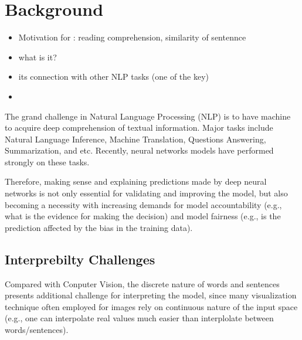 

\section{Background}


\begin{itemize}
    \item Motivation for : reading comprehension, similarity of sentennce
    \item what is it?
    \item its connection with other NLP tasks (one of the key)
    \item
\end{itemize}

The grand challenge in Natural Language Processing (NLP) is to have machine to acquire
deep comprehension of textual information. Major tasks include Natural Language Inference,
Machine Translation, Questions Answering, Summarization, and etc. 
Recently, neural networks models have performed strongly on these tasks. 

Therefore, making sense and explaining predictions made by deep neural networks is not only 
essential for validating and improving the model, but also becoming a necessity with 
increasing demands for model accountability (e.g., what is the evidence for making the decision) 
and model fairness (e.g., is the prediction affected by the bias in the training data).


%



\subsection{Interprebilty Challenges}

Compared with Conputer Vision, the discrete nature of words and sentences 
presents additional challenge for
interpreting the model, since many visualization technique often employed
for images rely on continuous nature of the input space (e.g., one can interpolate
real values much easier than interplolate between words/sentences).

